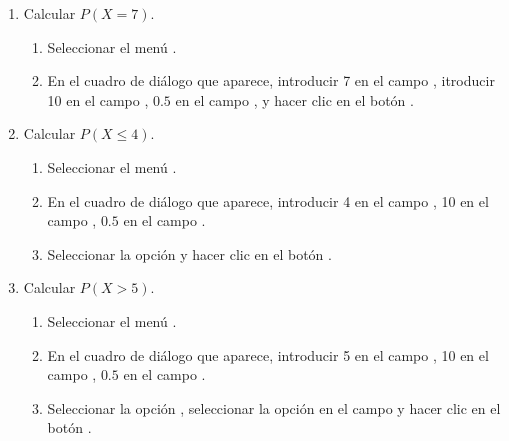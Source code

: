 \begin{enumerate}[leftmargin=*]
\begin{enumerate}
\item Calcular $P(X=7)$.
\begin{indicacion}{
\begin{enumerate}
\item Seleccionar el menú .
\item En el cuadro de diálogo que aparece, introducir 7 en el campo ,
itroducir 10 en el campo , $0.5$ en el campo , y hacer clic
en el botón .
\end{enumerate}}
\end{indicacion}

\item Calcular $P(X\leq 4)$.
\begin{indicacion}{
\begin{enumerate}
\item Seleccionar el menú .
\item En el cuadro de diálogo que aparece, introducir 4 en el campo , 10 en el campo
, $0.5$ en el campo .
\item Seleccionar la opción  y hacer clic en el botón .
\end{enumerate}}
\end{indicacion}

\item Calcular $P(X>5)$.
\begin{indicacion}{
\begin{enumerate}
\item Seleccionar el menú .
\item En el cuadro de diálogo que aparece, introducir 5 en el campo , 10 en el campo
, $0.5$ en el campo .
\item Seleccionar la opción , seleccionar la opción 
en el campo  y hacer clic en el botón .
\end{enumerate}}
\end{indicacion}


\end{enumerate}
\end{enumerate}
